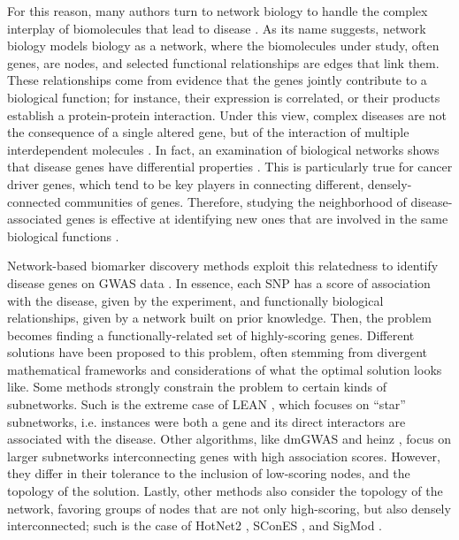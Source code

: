 \documentclass[twocolumn, 11pt]{article}
\begin{document}
For this reason, many authors turn to network biology to handle the complex interplay of biomolecules that lead to disease \cite{furlong_human_2013}. As its name suggests, network biology models biology as a network, where the biomolecules under study, often genes, are nodes, and selected functional relationships are edges that link them. These relationships come from evidence that the genes jointly contribute to a biological function; for instance, their expression is correlated, or their products establish a protein-protein interaction. Under this view, complex diseases are not the consequence of a single altered gene, but of the interaction of multiple interdependent molecules \cite{barabasi_network_2011}. In fact, an examination of biological networks shows that disease genes have differential properties \cite{barabasi_network_2011,pinero_uncovering_2016}. This is particularly true for cancer driver genes, which tend to be key players in connecting different, densely-connected communities of genes. Therefore, studying the neighborhood of disease-associated genes is effective at identifying new ones that are involved in the same biological functions \cite{huang_systematic_2018}. 

Network-based biomarker discovery methods exploit this relatedness to identify disease genes on GWAS data \cite{azencott_network-guided_2016}. In essence, each SNP has a score of association with the disease, given by the experiment, and functionally biological relationships, given by a network built on prior knowledge. Then, the problem becomes finding a functionally-related set of highly-scoring genes. Different solutions have been proposed to this problem, often stemming from divergent mathematical frameworks and considerations of what the optimal solution looks like. Some methods strongly constrain the problem to certain kinds of subnetworks. Such is the extreme case of LEAN \cite{gwinner_network-based_2016}, which focuses on ``star'' subnetworks, i.e. instances were both a gene and its direct interactors are associated with the disease. Other algorithms, like dmGWAS \cite{jia_dmgwas:_2011} and heinz \cite{dittrich_identifying_2008}, focus on larger subnetworks interconnecting genes with high association scores. However, they differ in their tolerance to the inclusion of low-scoring nodes, and the topology of the solution. Lastly, other methods also consider the topology of the network, favoring groups of nodes that are not only high-scoring, but also densely interconnected; such is the case of HotNet2 \cite{leiserson_pan-cancer_2015}, SConES \cite{azencott_efficient_2013}, and SigMod \cite{liu_sigmod:_2017}.
\end{document}
